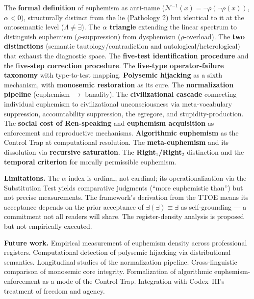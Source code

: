 \documentclass[11pt, oneside]{article}
\theoremstyle{definition}
\begin{document}
The \textbf{formal definition} of euphemism as anti-name ($\mathcal{N}^{-1}(x) = \neg\rho(\neg\rho(x))$, $\alpha < 0$), structurally distinct from the lie (Pathology 2) but identical to it at the ontosemantic level ($\Lambda \neq \exists$). The \textbf{$\alpha$ triangle} extending the linear spectrum to distinguish euphemism ($\rho$-suppression) from dysphemism ($\rho$-overload). The \textbf{two distinctions} (semantic tautology/contradiction and autological/heterological) that exhaust the diagnostic space. The \textbf{five-test identification procedure} and the \textbf{five-step correction procedure}. The \textbf{five-type operator-failure taxonomy} with type-to-test mapping. \textbf{Polysemic hijacking} as a sixth mechanism, with \textbf{monosemic restoration} as its cure. The \textbf{normalization pipeline} (euphemism $\to$ banality). The \textbf{civilizational cascade} connecting individual euphemism to civilizational unconsciousness via meta-vocabulary suppression, accountability suppression, the egregore, and stupidity-production. The \textbf{social cost of Ren-speaking} and \textbf{euphemism acquisition} as enforcement and reproductive mechanisms. \textbf{Algorithmic euphemism} as the Control Trap at computational resolution. The \textbf{meta-euphemism} and its dissolution via \textbf{recursive saturation}. The \textbf{Right$_1$/Right$_2$} distinction and the \textbf{temporal criterion} for morally permissible euphemism.

\textbf{Limitations.} The $\alpha$ index is ordinal, not cardinal; its operationalization via the Substitution Test yields comparative judgments (``more euphemistic than'') but not precise measurements. The framework's derivation from the TTOE means its acceptance depends on the prior acceptance of $\exists(\exists) \equiv \exists$ as self-grounding --- a commitment not all readers will share. The register-density analysis is proposed but not empirically executed.

\textbf{Future work.} Empirical measurement of euphemism density across professional registers. Computational detection of polysemic hijacking via distributional semantics. Longitudinal studies of the normalization pipeline. Cross-linguistic comparison of monosemic core integrity. Formalization of algorithmic euphemism-enforcement as a mode of the Control Trap. Integration with Codex~III's \cite{codex3} treatment of freedom and agency.
\end{document}
